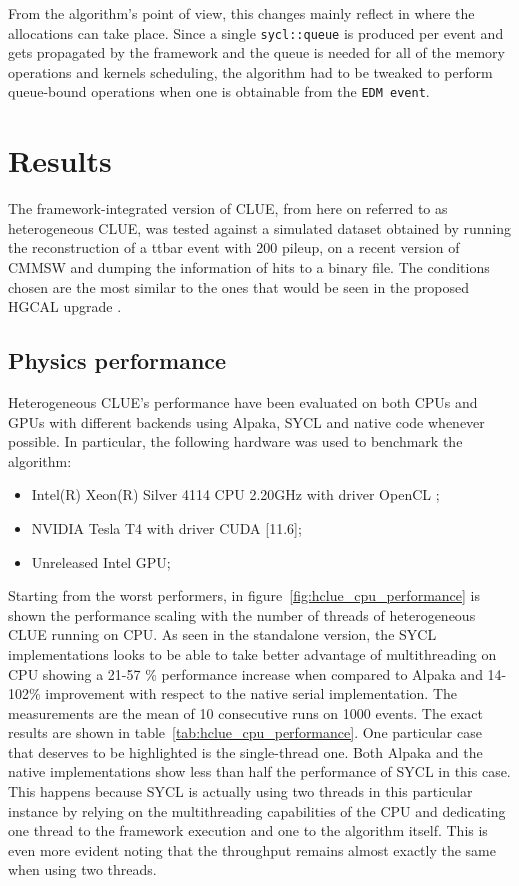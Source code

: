 From the algorithm's point of view, this changes mainly reflect in where the allocations can take place. Since a single \Verb "sycl::queue" is produced per event and gets propagated by the framework and the queue is needed for all of the memory operations and kernels scheduling, the algorithm had to be tweaked to perform queue-bound operations when one is obtainable from the \Verb "EDM event".

\section{Results}
The framework-integrated version of CLUE, from here on referred to as heterogeneous CLUE, was tested against a simulated dataset obtained by running the reconstruction of a ttbar event with 200 pileup, on a recent version of CMMSW and dumping the information of hits to a binary file. The conditions chosen are the most similar to the ones that would be seen in the proposed HGCAL upgrade \cite{hgcal}.
\subsection{Physics performance}
Heterogeneous CLUE's performance have been evaluated on both CPUs and GPUs with different backends using Alpaka, SYCL and native code whenever possible. In particular, the following hardware was used to benchmark the algorithm:

\begin{itemize}
    \item Intel(R) Xeon(R) Silver 4114 CPU 2.20GHz with driver OpenCL \newline [2022.14.7.0.30\textunderscore160000];
    \item NVIDIA Tesla T4 with driver CUDA [11.6];
    \item Unreleased Intel GPU;
\end{itemize} 

Starting from the worst performers, in figure~\ref{fig:hclue_cpu_performance} is shown the performance scaling with the number of threads of heterogeneous CLUE running on CPU. As seen in the standalone version, the SYCL implementations looks to be able to take better advantage of multithreading on CPU showing a 21-57 \% performance increase when compared to Alpaka and 14-102\% improvement with respect to the native serial implementation. The measurements are the mean of 10 consecutive runs on 1000 events. The exact results are shown in table~\ref{tab:hclue_cpu_performance}. One particular case that deserves to be highlighted is the single-thread one. Both Alpaka and the native implementations show less than half the performance of SYCL in this case. This happens because SYCL is actually using two threads in this particular instance by relying on the multithreading capabilities of the CPU and dedicating one thread to the framework execution and one to the algorithm itself. This is even more evident noting that the throughput remains almost exactly the same when using two threads.


